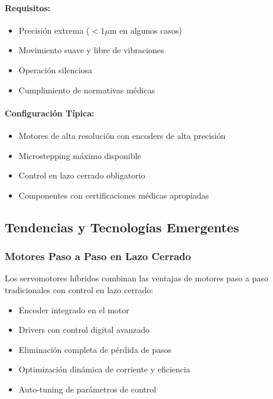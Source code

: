 \paragraph{Requisitos:}

\begin{itemize}
    \item Precisión extrema ($< 1 \mu$m en algunos casos)
    \item Movimiento suave y libre de vibraciones
    \item Operación silenciosa
    \item Cumplimiento de normativas médicas
\end{itemize}

\paragraph{Configuración Típica:}

\begin{itemize}
    \item Motores de alta resolución con encoders de alta precisión
    \item Microstepping máximo disponible
    \item Control en lazo cerrado obligatorio
    \item Componentes con certificaciones médicas apropiadas
\end{itemize}

\subsection{Tendencias y Tecnologías Emergentes}

\subsubsection{Motores Paso a Paso en Lazo Cerrado}

Los servomotores híbridos combinan las ventajas de motores paso a paso tradicionales con control en lazo cerrado:

\begin{itemize}
    \item Encoder integrado en el motor
    \item Drivers con control digital avanzado
    \item Eliminación completa de pérdida de pasos
    \item Optimización dinámica de corriente y eficiencia
    \item Auto-tuning de parámetros de control
\end{itemize}

